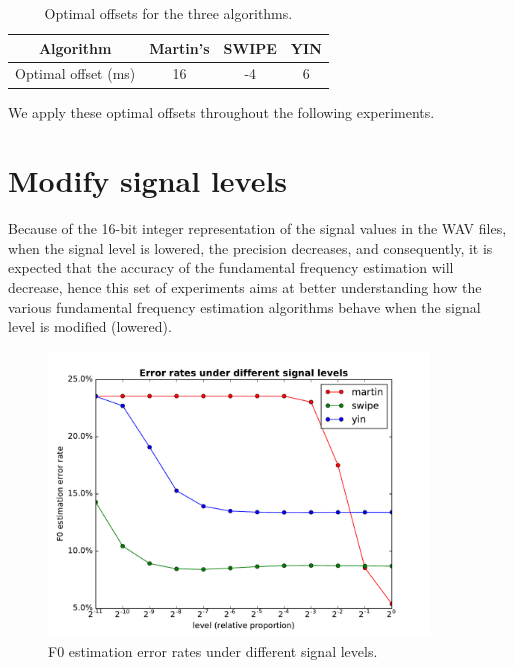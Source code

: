 \documentclass[11pt,a4paper]{report}
\begin{document}
\begin{table}[htbp]
  \centering
  \begin{tabular}{cSSS}
  	\toprule
  	             Algorithm              & {Martin's} & {SWIPE} & {YIN} \\
  	\midrule
  	Optimal offset (\si{\milli\second}) & 16         & -4      & 6     \\
  	\bottomrule
  \end{tabular}
  \caption{Optimal offsets for the three algorithms.} \label{tab:offsets}
\end{table}

We apply these optimal offsets throughout the following experiments.

\section{Modify signal levels}

Because of the 16-bit integer representation of the signal values in the WAV files, when the signal level is lowered, the precision decreases, and consequently, it is expected that the accuracy of the fundamental frequency estimation will decrease, hence this set of experiments aims at better understanding how the various fundamental frequency estimation algorithms behave when the signal level is modified (lowered).

\begin{figure}[htbp]
  \centering
  \includegraphics[width=0.9\textwidth]{error_rates_vs_signal_levels.pdf}
  \caption{F0 estimation error rates under different signal levels.} \label{fig:levels}
\end{figure}
\end{document}
